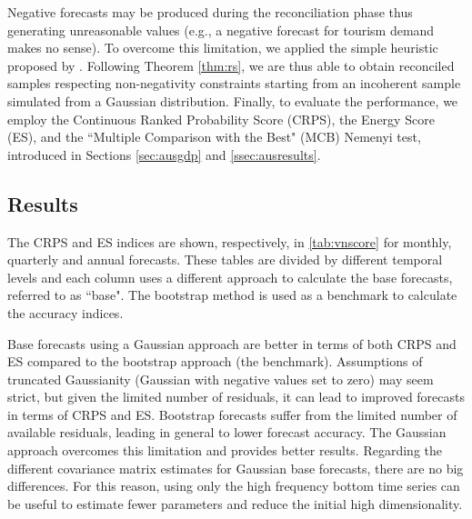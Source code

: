 \documentclass[a4paper,11pt]{article}
\theoremstyle{definition}
\begin{document}
Negative forecasts may be produced during the reconciliation phase \citep{wickramasuriya2020, difonzo2022a, difonzo2023a} thus generating unreasonable values (e.g., a negative forecast for tourism demand makes no sense). To overcome this limitation, we applied the simple heuristic proposed by \cite{difonzo2022b, difonzo2023a}. Following Theorem \ref{thm:rs}, we are thus able to obtain reconciled samples respecting non-negativity constraints starting from an incoherent sample simulated from a Gaussian distribution. Finally, to evaluate the performance, we employ the Continuous Ranked Probability Score (CRPS), the Energy Score (ES), and the “Multiple Comparison with the Best" (MCB) Nemenyi test, introduced in Sections \ref{sec:ausgdp} and \ref{ssec:ausresults}.

\subsection{Results}


\begin{table}[!tb]
	\centering
	\begingroup
	\fontsize{9}{10}\selectfont
	
	\endgroup
	\caption{$\overline{RelCRPS}$ and ES ratio indices defined in \eqref{eq:skill} and \eqref{eq:skill_all} for the Australian Tourism Demand dataset. %
	Approaches performing worse than the benchmark (bootstrap base forecasts, ctjb) are highlighted in red, the best for each column is marked in bold, and the overall lowest value is highlighted in blue. The reconciliation approaches are described in \autoref{tab:notation}.}
	\label{tab:vnscore}
	\vspace*{-0.5\baselineskip}
\end{table}

The CRPS and ES indices are shown, respectively, in \autoref{tab:vnscore} for monthly, quarterly and annual forecasts. These tables are divided by different temporal levels and each column uses a different approach to calculate the base forecasts, referred to as “base". The bootstrap method is used as a benchmark to calculate the accuracy indices.


Base forecasts using a Gaussian approach are better in terms of both CRPS and ES compared to the bootstrap approach (the benchmark). Assumptions of truncated Gaussianity (Gaussian with negative values set to zero) may seem strict, but given the limited number of residuals, it can lead to improved forecasts in terms of CRPS and ES. Bootstrap forecasts suffer from the limited number of available residuals, leading in general to lower forecast accuracy. The Gaussian approach overcomes this limitation and provides better results. Regarding the different covariance matrix estimates for Gaussian base forecasts, there are no big differences. For this reason, using only the high frequency bottom time series can be useful to estimate fewer parameters and reduce the initial high dimensionality.
\end{document}

